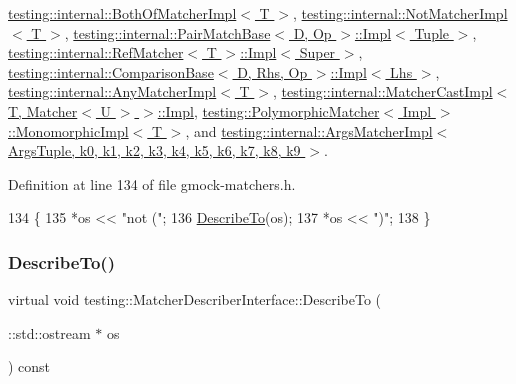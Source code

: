 \hyperlink{classtesting_1_1internal_1_1BothOfMatcherImpl_a4f6017c7aca6e5c8166ff4c613d8dbec}{testing\+::internal\+::\+Both\+Of\+Matcher\+Impl$<$ T $>$}, \hyperlink{classtesting_1_1internal_1_1NotMatcherImpl_a960f799e25ba7264d0d45fa61bb9271c}{testing\+::internal\+::\+Not\+Matcher\+Impl$<$ T $>$}, \hyperlink{classtesting_1_1internal_1_1PairMatchBase_1_1Impl_ac687a0bd4df52f60a25ef9bf31b269db}{testing\+::internal\+::\+Pair\+Match\+Base$<$ D, Op $>$\+::\+Impl$<$ Tuple $>$}, \hyperlink{classtesting_1_1internal_1_1RefMatcher_3_01T_01_6_01_4_1_1Impl_aa9ee30325e568c5599dd76f8823bf876}{testing\+::internal\+::\+Ref\+Matcher$<$ T $>$\+::\+Impl$<$ Super $>$}, \hyperlink{classtesting_1_1internal_1_1ComparisonBase_1_1Impl_ab4a33d42d0941bc94e3b0051ce76bb72}{testing\+::internal\+::\+Comparison\+Base$<$ D, Rhs, Op $>$\+::\+Impl$<$ Lhs $>$}, \hyperlink{classtesting_1_1internal_1_1AnyMatcherImpl_ac6570e881174ba774b8d56abaa4f7d25}{testing\+::internal\+::\+Any\+Matcher\+Impl$<$ T $>$}, \hyperlink{classtesting_1_1internal_1_1MatcherCastImpl_3_01T_00_01Matcher_3_01U_01_4_01_4_1_1Impl_a2d363b3748fd1f4fd98372d1f4bfce4e}{testing\+::internal\+::\+Matcher\+Cast\+Impl$<$ T, Matcher$<$ U $>$ $>$\+::\+Impl}, \hyperlink{classtesting_1_1PolymorphicMatcher_1_1MonomorphicImpl_a699910683db97c94f23da3e131604e76}{testing\+::\+Polymorphic\+Matcher$<$ Impl $>$\+::\+Monomorphic\+Impl$<$ T $>$}, and \hyperlink{classtesting_1_1internal_1_1ArgsMatcherImpl_ac8ff5369879836567cedb5434bcca5b9}{testing\+::internal\+::\+Args\+Matcher\+Impl$<$ Args\+Tuple, k0, k1, k2, k3, k4, k5, k6, k7, k8, k9 $>$}.



Definition at line 134 of file gmock-\/matchers.\+h.


\begin{DoxyCode}
134                                                         \{
135     *os << \textcolor{stringliteral}{"not ("};
136     \hyperlink{classtesting_1_1MatcherDescriberInterface_ad9f861588bd969b6e3e717f13bb94e7b}{DescribeTo}(os);
137     *os << \textcolor{stringliteral}{")"};
138   \}
\end{DoxyCode}
\mbox{\label{classtesting_1_1MatcherDescriberInterface_ad9f861588bd969b6e3e717f13bb94e7b}} 
\subsubsection{\texorpdfstring{Describe\+To()}{DescribeTo()}}
{\footnotesize\ttfamily virtual void testing\+::\+Matcher\+Describer\+Interface\+::\+Describe\+To (\begin{DoxyParamCaption}\item[{\+::std\+::ostream $\ast$}]{os }\end{DoxyParamCaption}) const\hspace{0.3cm}{\ttfamily [pure virtual]}}



